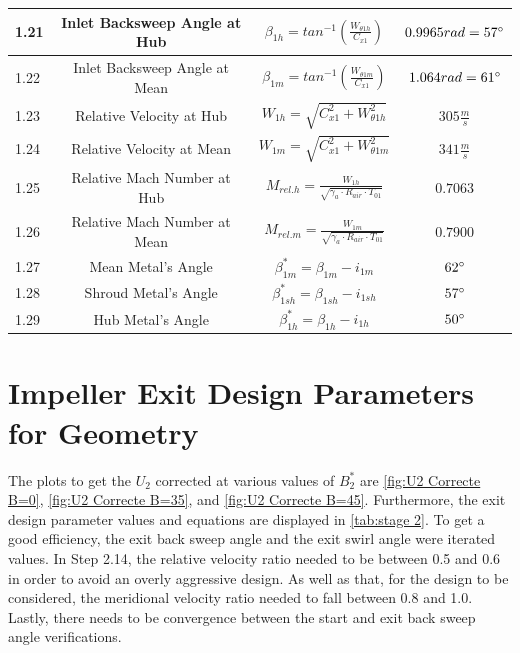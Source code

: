 \documentclass[12pt, letter]{report}
\begin{document}
\begin{table}
\begin{tabular}{|l|c|c|c|}
1.21& Inlet Backsweep Angle at Hub& $\beta_{1h}=tan^{-1}(\frac{W_{\theta1h}}{C_{x1}})$& $0.9965rad=57 \degree$\\ \hline 
1.22& Inlet Backsweep Angle at Mean& $\beta_{1m}=tan^{-1}(\frac{W_{\theta1m}}{C_{x1}})$& $1.064rad=61 \degree$\\ \hline 
1.23& Relative Velocity at Hub& $W_{1h}=\sqrt{C_{x1}^2+W_{\theta1h}^2}$& $305 \frac{m}{s}$\\ \hline 
1.24& Relative Velocity at Mean& $W_{1m}=\sqrt{C_{x1}^2+W_{\theta1m}^2}$& $341 \frac{m}{s}$\\ \hline 
1.25& Relative Mach Number at Hub& $M_{rel.h}=\frac{W_{1h}}{\sqrt{\gamma_a \cdot R_{air} \cdot T_{01}}}$& $0.7063$\\ \hline 
1.26& Relative Mach Number at Mean& $M_{rel.m}=\frac{W_{1m}}{\sqrt{\gamma_a \cdot R_{air} \cdot T_{01}}}$& $0.7900$\\ \hline
1.27& Mean Metal's Angle& $\beta^*_{1m}=\beta_{1m}-i_{1m}$& $62 \degree$\\ \hline 
1.28& Shroud Metal's Angle& $\beta^*_{1sh}=\beta_{1sh}-i_{1sh}$& $57 \degree$\\ \hline 
1.29& Hub Metal's Angle& $\beta^*_{1h}=\beta_{1h}-i_{1h}$& $50 \degree$\\ \hline 
    \end{tabular}
    
    \label{Stage 1}
\end{table}

\section{Impeller Exit Design Parameters for Geometry}

The plots to get the $U_2$ corrected at various values of $B^*_2$ are \autoref{fig:U2 Correcte B=0}, \autoref{fig:U2 Correcte B=35}, and \autoref{fig:U2 Correcte B=45}. Furthermore, the exit design parameter values and equations are displayed in \autoref{tab:stage 2}. To get a good efficiency, the exit back sweep angle and the exit swirl angle were iterated values. In Step 2.14, the relative velocity ratio needed to be between 0.5 and 0.6 in order to avoid an overly aggressive design. As well as that, for the design to be considered, the meridional velocity ratio needed to fall between 0.8 and 1.0. Lastly, there needs to be convergence between the start and exit back sweep angle verifications. \par
\end{document}
